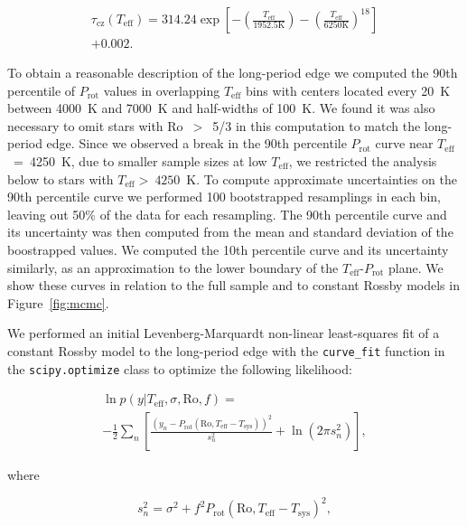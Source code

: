 \documentclass[linenumbers,trackchanges,twocolumn]{aastex631}
\newcommand{\lamostmcq}{LAMOST--McQuillan\xspace}
\newcommand{\teff}{\ensuremath{T_{\mathrm{eff}}}\xspace}
\newcommand{\prot}{\ensuremath{P_\mathrm{rot}}\xspace}
\begin{document}
\begin{multline} \label{eq:2}
\tau_\mathrm{cz}(\teff) = 314.24\exp \left [ -\left (\frac{T_\mathrm{eff}}{1952.5 \mathrm{K}}  \right ) - \left (\frac{T_\mathrm{eff}}{6250 \mathrm{K}}  \right )^{18} \right ] \\+ 0.002.
\end{multline}

To obtain a reasonable description of the long-period edge we computed the 90th percentile of \prot values in overlapping \teff bins with centers located every 20~K between 4000~K and 7000~K and half-widths of 100~K. We found it was also necessary to omit stars with Ro~$>$~5/3 in this computation to match the long-period edge. Since we observed a break in the 90th percentile \prot curve near \teff~=~4250~K, due to smaller sample sizes at low \teff, we restricted the analysis below to stars with \teff$>~4250$~K. To compute approximate uncertainties on the 90th percentile curve we performed 100 bootstrapped resamplings in each bin, leaving out 50\% of the data for each resampling. The 90th percentile curve and its uncertainty was then computed from the mean and standard deviation of the boostrapped values. We computed the 10th percentile curve and its uncertainty similarly, as an approximation to the lower boundary of the \teff-\prot plane. We show these curves in relation to the full \edit1{\lamostmcq} sample and to constant Rossby models in Figure~\ref{fig:mcmc}.

We performed an initial Levenberg-Marquardt non-linear least-squares fit of a constant Rossby model to the long-period edge with the \texttt{curve\_fit} function in the \texttt{scipy.optimize} class to optimize the following likelihood: 

\begin{multline} \label{eq:3}
    \ln{p} (y | T_\mathrm{eff}, \sigma, \mathrm{Ro}, f) =\\ -\frac{1}{2}\sum_n \left [ \frac{(y_n - P_\mathrm{rot}(\mathrm{Ro}, T_\mathrm{eff} - T_\mathrm{sys}))^2}{s_n^2}  + \ln{(2\pi s_n^2)} \right ],
\end{multline}

where

\begin{equation} \label{eq:4}
    s_n^2 = \sigma^2 + f^2 P_\mathrm{rot}(\mathrm{Ro}, T_\mathrm{eff} - T_\mathrm{sys})^2,
\end{equation}
\end{document}
